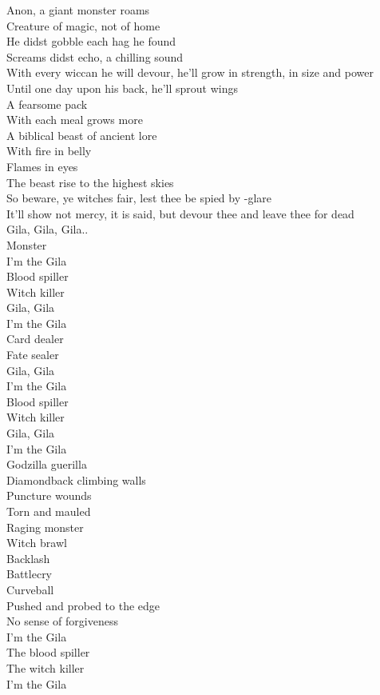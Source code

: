 
Anon, a giant monster roams\\
Creature of magic, not of home\\
He didst gobble each hag he found\\
Screams didst echo, a chilling sound\\
With every wiccan he will devour, he'll grow in strength, in size and power\\
Until one day upon his back, he'll sprout wings\\
A fearsome pack\\
With each meal  grows more\\
A biblical beast of ancient lore\\
With fire in belly\\
Flames in eyes\\
The beast rise to the highest skies\\
So beware, ye witches fair, lest thee be spied by -glare\\
It'll show not mercy, it is said, but devour thee and leave thee for dead\\

Gila, Gila, Gila..\\
Monster\\

I'm the Gila\\
Blood spiller\\
Witch killer\\
Gila, Gila\\
I'm the Gila\\
Card dealer\\
Fate sealer\\
Gila, Gila\\
I'm the Gila\\
Blood spiller\\
Witch killer\\
Gila, Gila\\
I'm the Gila\\
Godzilla guerilla\\

Diamondback climbing walls\\
Puncture wounds\\
Torn and mauled\\
Raging monster\\
Witch brawl\\
Backlash\\
Battlecry\\
Curveball\\
Pushed and probed to the edge\\
No sense of forgiveness\\
I'm the Gila\\
The blood spiller\\
The witch killer\\
I'm the Gila\\

